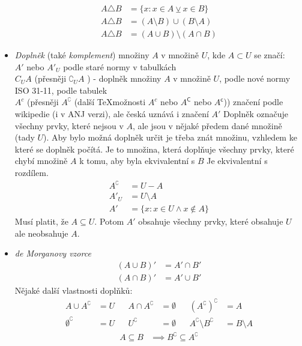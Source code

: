 \documentclass[12pt]{article}
\providecommand{\lxor}{\veebar}
\begin{document}
\begin{itemize}
\begin{align}
A \triangle B &= \{ x: x \in A \lxor x \in B \} \\
A \triangle B &= (A \setminus B) \cup (B \setminus A)\\
A \triangle B &= (A \cup B) \setminus (A \cap B)
\end{align}
\item \emph{Doplněk} (také \emph{komplement}) množiny $A$ v množině $U$, kde $A \subset U$ se značí:\\
$A'$ nebo $A'_{U}$ podle staré normy v tabulkách\\
$C_U A$ (přesněji $\complement_U A$ ) - doplněk množiny $A$ v množině $U$, podle nové normy ISO 31-11, podle tabulek\\
$A^c$  (přesněji $A^\complement$ (další \TeX možnosti $A^c$ nebo $A^\mathsf{C}$ nebo $A^\mathsf{c}$)) značení podle wikipedie (i v ANJ verzi), ale česká uznává i značení $A'$
Doplněk označuje všechny prvky, které nejsou v $A$, ale jsou v nějaké předem dané množině (tady $U$). Aby bylo možná doplněk určit je třeba znát množinu, vzhledem ke které se doplněk počítá. Je to množina, která doplňuje všechny prvky, které chybí množině $A$ k tomu, aby byla ekvivalentní s $B$ Je ekvivalentní s rozdílem.
\begin{align}
A^\complement &= U - A\\
A'_U &= U \setminus A \\
A' &= \{ x: x \in U \land x \notin A \}
\end{align}
Musí platit, že $A \subseteq U$. Potom $A'$ obsahuje všechny prvky, které obsahuje $U$ ale neobsahuje $A$. 
\item \emph{de Morganovy vzorce}
\begin{align}
(A \cup B)' &= A' \cap B' \\
(A \cap B)' &= A' \cup B'
\end{align}
Nějaké další vlastnosti doplňků:
\begin{align*}
A \cup A^\complement &= U && A \cap A^\complement &= \emptyset && (A^\complement)^\complement &= A  \\
\emptyset^\complement &= U && U^\complement &= \emptyset && A^\complement \setminus B^\complement &= B \setminus A
\end{align*}
\begin{align*}
A \subseteq B &\implies B^\complement \subseteq A^\complement
\end{align*}


\end{itemize}
\end{document}
